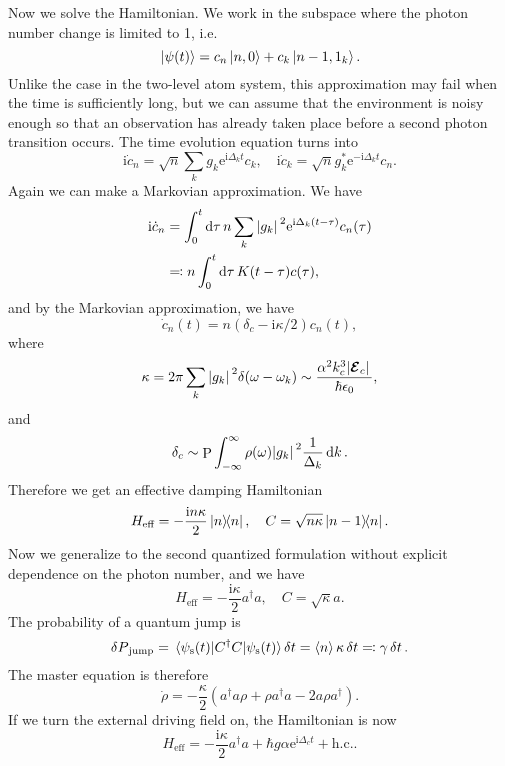 \documentclass[hyperref, a4paper]{article}
\DeclareMathOperator{\primevalue}{P}
\newcommand*{\ii}{\mathrm{i}}
\newcommand*{\ee}{\mathrm{e}}
\begin{document}
Now we solve the Hamiltonian. We work in the subspace where the photon number change is limited to 1, i.e.
\begin{equation}
    \ket*{\psi(t)} = c_n \ket*{n, 0} + c_k \ket*{n-1, 1_k}.
\end{equation}
Unlike the case in the two-level atom system, this approximation may fail when the time is sufficiently long,
but we can assume that the environment is noisy enough so that an observation has already taken place before 
a second photon transition occurs. The time evolution equation turns into
\begin{equation}
    \ii \dot{c}_n = \sqrt{n} \sum_k g_k \ee^{\ii \Delta_k t} c_k, \quad 
    \ii \dot{c}_k = \sqrt{n} g_k^* \ee^{- \ii \Delta_k t} c_n. 
\end{equation} 
Again we can make a Markovian approximation. We have 
\[
    \begin{aligned}
        \ii \dot{c}_n &= \int_0^t \dd{\tau} n \sum_k \abs*{g_k}^2 \ee^{\ii \Delta_k (t - \tau)} c_n(\tau) \\
        &\eqqcolon n \int_0^t \dd{\tau } K(t - \tau) c(\tau),
    \end{aligned}
\]
and by the Markovian approximation, we have 
\begin{equation}
    \dot{c}_n(t) = n (\delta_c - \ii \kappa / 2) c_n(t),
\end{equation}
where 
\begin{equation}
    \kappa = 2 \pi \sum_k \abs*{g_k}^2 \delta(\omega - \omega_k) \sim \frac{\alpha^2 k_c^3 \abs*{\vb*{\mathcal{E}}_c}}{\hbar \epsilon_0},
\end{equation}
and 
\begin{equation}
    \delta_c \sim \primevalue \int_{-\infty}^\infty \rho(\omega) \abs*{g_k}^2 \frac{1}{\Delta_k} \dd{k}.
\end{equation}
Therefore we get an effective damping Hamiltonian 
\begin{equation}
    H_\text{eff} = - \frac{\ii n \kappa}{2} \dyad{n}, \quad C = \sqrt{n \kappa} \dyad*{n-1}{n}.
\end{equation}
Now we generalize to the second quantized formulation without explicit dependence on the photon number, and we have 
\begin{equation}
    H_\text{eff} = - \frac{\ii \kappa}{2} a^\dagger a, \quad C = \sqrt{\kappa} a.
\end{equation}
The probability of a quantum jump is 
\begin{equation}
    \var{P}_\text{jump} = \mel{\psi_\text{s}(t)}{C^\dagger C}{\psi_\text{s}(t)} \var{t} = \expval{n} \kappa \var{t} \eqqcolon \gamma \var{t}.
\end{equation}
The master equation is therefore 
\begin{equation}
    \dot{\rho} = - \frac{\kappa}{2} \left( a^\dagger a \rho + \rho a^\dagger a - 2 a \rho a^\dagger \right).
\end{equation}
If we turn the external driving field on, the Hamiltonian is now 
\begin{equation}
    H_\text{eff} = - \frac{\ii \kappa}{2} a^\dagger a + \hbar g \alpha \ee^{\ii \Delta_c t} + \text{h.c.}.
    \label{eq:damping-and-driving}
\end{equation}
\end{document}
